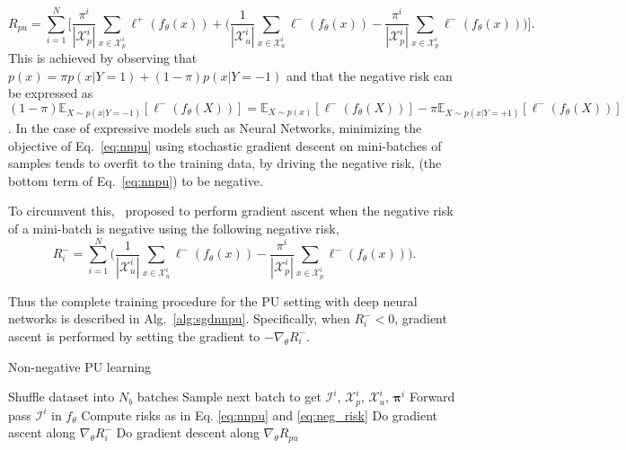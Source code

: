 \begin{equation}
  \label{eq:nnpu}
R_{pu}=\sum_{i=1}^{N}\Biggl[ \frac{\pi^{i}}{|\mathcal{X}^{i}_{p}|}\sum_{x \in \mathcal{X}^{i}_p}\ell^+(f_{\theta}(x)) +
\Biggl( \frac{1}{|\mathcal{X}^{i}_{u}|}\sum_{x \in \mathcal{X}^{i}_u}\ell^-(f_{\theta}(x)) -
\frac{\pi^{i}}{|\mathcal{X}^{i}_{p}|}\sum_{x \in \mathcal{X}^{i}_p}\ell^-(f_{\theta}(x)) \Biggr) \Biggr].
\end{equation}
This is achieved by observing that $p(x) = \pi p(x|Y=1) + (1-\pi) p(x|Y=-1)$ and that the negative risk can be expressed as $ (1-\pi) \mathbb{E}_{X \sim p(x|Y=-1)}\left[\ell^-(f_\theta(X)) \right] =
\mathbb{E}_{X \sim p(x)}\left[\ell^-(f_\theta(X)) \right] - \pi \mathbb{E}_{X \sim p(x|Y=+1)}\left[\ell^-(f_\theta(X)) \right]$. In the case of expressive models such as Neural Networks, minimizing the objective of Eq.~\eqref{eq:nnpu} using stochastic gradient descent on mini-batches of samples tends to overfit to the training data, by driving the negative risk, (\ie the bottom term of Eq.~\eqref{eq:nnpu}) to be negative.

To circumvent this,~\cite{kiryo17} proposed to perform gradient ascent when the negative risk of a mini-batch is negative using the following negative risk,
\begin{equation}
  \label{eq:neg_risk}
R_{i}^{-}=\sum_{i=1}^N\Biggl(
 \frac{1}{|\mathcal{X}^{i}_{u}|}\sum_{x \in \mathcal{X}^{i}_u}\ell^-(f_{\theta}(x)) - 
\frac{\pi^{i}}{|\mathcal{X}^{i}_{p}|}\sum_{x \in \mathcal{X}^{i}_p}\ell^-(f_{\theta}(x)) \Biggr).
\end{equation}

Thus the complete training procedure for the PU setting with deep neural networks is described in Alg.~\ref{alg:sgdnnpu}. Specifically, when \(R_{i}^{-} < 0\), gradient ascent is performed by setting the gradient to \(-\nabla_\theta R_{i}^{-}\). 
\begin{algorithm}[H]
\caption{Non-negative PU learning}
\label{alg:sgdnnpu}
\begin{algorithmic}[1]
\State Shuffle dataset into $N_{b}$ batches
     \State Sample next batch to get $\mathcal{I}^i$, $\mathcal{X}_p^i$, $\mathcal{X}_u^i$, $\bm{\pi}^i$
	\State Forward pass $\mathcal{I}^i$ in $f_\theta$
	\State Compute risks as in Eq. \ref{eq:nnpu} and \ref{eq:neg_risk}
          \State Do gradient ascent along $\nabla_\theta R_{i}^{-}$
      \Else
          \State Do gradient descent along $\nabla_\theta R_{pu}$
      \EndIf
  \EndFor
\EndFor
\end{algorithmic}
\end{algorithm}

